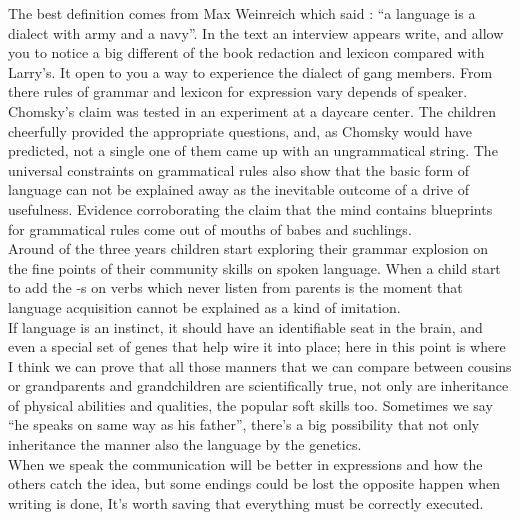 \documentclass[13pt,letterpaper,onecolumn]{report}
\begin{document}
\hspace{1em} The best definition comes from Max Weinreich which said : “a language is a dialect with army and a navy”. In the text an interview appears write, and allow you to notice a big different of the book redaction and lexicon compared with Larry’s. It open to you a way to experience the dialect of gang members. From there rules of grammar and lexicon for expression vary depends of speaker.\\

\hspace{1em} Chomsky’s claim was tested in an experiment at a daycare center. The children cheerfully provided the appropriate questions, and, as Chomsky would have predicted, not a single one of them came up with an ungrammatical string. The universal constraints on grammatical rules also show that the basic form of language can not be explained away as the inevitable outcome of a drive of usefulness. Evidence corroborating the claim that the mind contains blueprints for grammatical rules come out of mouths of babes and suchlings.\\

\hspace{1em} Around of the three years children start exploring their grammar explosion on the fine points of their community skills on spoken language. When a child start to add the -s on verbs which never listen from parents is the moment that language acquisition cannot be explained as a kind of imitation.\\

\hspace{1em} If language is an instinct, it should have an identifiable seat in the brain, and even a special set of genes that help wire it into place; here in this point is where I think we can prove that all those manners that we can compare between cousins or grandparents and grandchildren are scientifically true, not only are inheritance of physical abilities and qualities, the popular soft skills too. Sometimes we say “he speaks on same way as his father”, there’s a big possibility that not only inheritance the manner also the language by the genetics.\\

\hspace{1em} When we speak the communication will be better in expressions and how the others catch the idea, but some endings could be lost the opposite happen  when writing is done,  It's worth saving that everything must be correctly executed.\\
\end{document}
